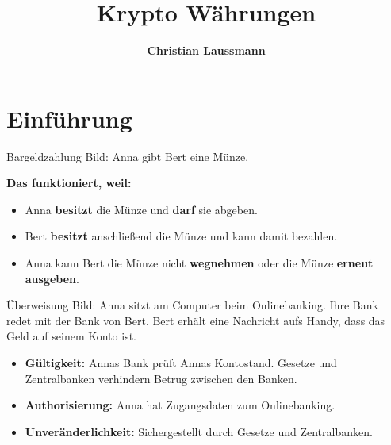 \documentclass[aspectratio=169]{beamer}
\title{\textbf{\Huge Krypto Währungen}}
\author{\textcolor{secondarycolor}{\textbf{Christian Laussmann}}}
\date{}
\begin{document}
\frame{\titlepage}





\section{Einführung}


\begin{frame}{Bargeldzahlung}
    Bild: Anna gibt Bert eine Münze.

    \pause
    \textbf{Das funktioniert, weil:}
    \begin{itemize}
        \item Anna \textbf{besitzt} die Münze und \textbf{darf} sie abgeben.
        \item Bert \textbf{besitzt} anschließend die Münze und kann damit bezahlen.
        \item Anna kann Bert die Münze nicht \textbf{wegnehmen} oder die Münze \textbf{erneut ausgeben}.
    \end{itemize}
\end{frame}



\begin{frame}{Überweisung}
    Bild: Anna sitzt am Computer beim Onlinebanking. Ihre Bank redet mit der Bank von Bert. Bert erhält eine Nachricht aufs Handy, dass das Geld auf seinem Konto ist.

    \pause
    \begin{itemize}
        \item \textbf{Gültigkeit:} Annas Bank prüft Annas Kontostand. Gesetze und Zentralbanken verhindern Betrug zwischen den Banken.
        \item \textbf{Authorisierung:} Anna hat Zugangsdaten zum Onlinebanking.
        \item \textbf{Unveränderlichkeit:} Sichergestellt durch Gesetze und Zentralbanken.
    \end{itemize}
\end{frame}
\end{document}
